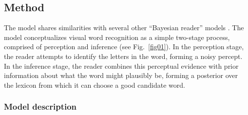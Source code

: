 \documentclass[doc,biblatex]{apa7}
\begin{document}
\subsection{Method}

The model shares similarities with several other ``Bayesian reader'' models \parencite{Norris:2006, Norris:2009, SmithChan:2010, Bicknell:2012, Norris:2012, Valdois:2021}. The model conceptualizes visual word recognition as a simple two-stage process, comprised of perception and inference (see Fig.~\ref{fig01}). In the perception stage, the reader attempts to identify the letters in the word, forming a noisy percept. In the inference stage, the reader combines this perceptual evidence with prior information about what the word might plausibly be, forming a posterior over the lexicon from which it can choose a good candidate word.

\subsubsection{Model description}
\end{document}
